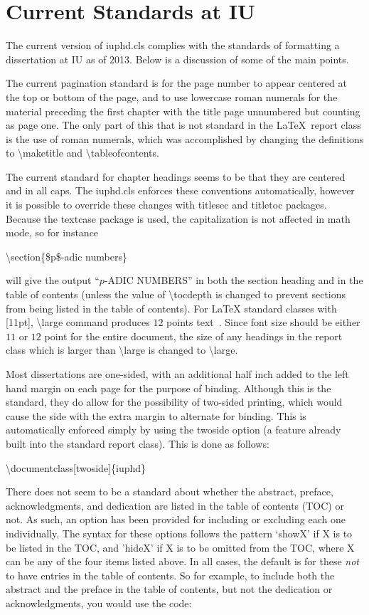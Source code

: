 \section{Current Standards at IU}
The current version of iuphd.cls complies with the standards of formatting a dissertation at IU as of 2013.  Below is a discussion of
some of the main points.

The current pagination standard is for the page number to appear centered at the top or bottom of the
page, and to use lowercase roman numerals for the material preceding the first chapter with the title page unnumbered but counting as
page one. The only part of this that is not standard in the \LaTeX \ report class is the use of roman numerals, which was accomplished
by changing the definitions to \textbackslash maketitle and \textbackslash tableofcontents.

The current standard for chapter headings seems to be that they are centered and in all caps.  The iuphd.cls enforces these
conventions automatically, however it is possible to override these changes with
titlesec and titletoc packages. Because the textcase package is used,
the capitalization is not affected in math mode, so for instance
\medskip

\textbackslash section\{\$p\$-adic numbers\}
\medskip

\noindent will give the output ``$p$-ADIC NUMBERS'' in both the section heading and in the table of contents
(unless the value of \textbackslash tocdepth is changed to prevent sections from being listed in the table of contents).
For LaTeX standard classes with [11pt], \textbackslash large command produces
$12$ points text~\cite{wiki:LaTeXFonts}. Since font size should be either $11$
or $12$ point for the entire document, the size of any headings in the report class
which is larger than \textbackslash large is changed to \textbackslash large.

Most dissertations are one-sided, with an additional half inch added to the left hand margin on each page for the purpose of binding.
Although this is the standard, they do allow for the possibility of two-sided printing, which would cause the side with the extra margin
to alternate for binding.  This is automatically enforced simply by using the twoside option (a feature already built into the
standard report class). This is done as follows:
\medskip

\textbackslash documentclass[twoside]\{iuphd\}
\medskip

There does not seem to be a standard about whether the abstract, preface, acknowledgments, and dedication are listed in the table of
contents (TOC) or not.  As such, an option has been provided for including or excluding each one individually.  The syntax for these options
follows the pattern `showX' if X is to be listed in the TOC, and 'hideX' if X is to be omitted from the TOC, where X can be any of the four
items listed above.  In all cases, the default is for these \emph{not} to have entries in the table of contents.  So for example, to include
both the abstract and the preface in the table of contents, but not the dedication or acknowledgments, you would use the code:
\medskip

